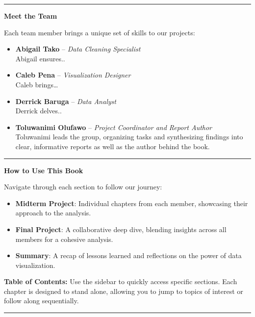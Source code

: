 \documentclass[
  letterpaper,
  DIV=11,
  numbers=noendperiod]{scrreprt}
\providecommand{\tightlist}{%
  \setlength{\itemsep}{0pt}\setlength{\parskip}{0pt}}\usepackage{longtable,booktabs,array}
\begin{document}
\begin{center}\rule{0.5\linewidth}{0.5pt}\end{center}

\textbf{Meet the Team}

Each team member brings a unique set of skills to our projects:

\begin{itemize}
\item
  \textbf{Abigail Tako} -- \emph{Data Cleaning Specialist}\\
  Abigail ensures..
\item
  \textbf{Caleb Pena} -- \emph{Visualization Designer}\\
  Caleb brings\ldots{}
\item
  \textbf{Derrick Baruga} -- \emph{Data Analyst}\\
  Derrick delves..
\item
  \textbf{Toluwanimi Olufawo} -- \emph{Project Coordinator and Report
  Author}\\
  Toluwanimi leads the group, organizing tasks and synthesizing findings
  into clear, informative reports as well as the author behind the book.
\end{itemize}

\begin{center}\rule{0.5\linewidth}{0.5pt}\end{center}

\textbf{How to Use This Book}

Navigate through each section to follow our journey:

\begin{itemize}
\tightlist
\item
  \textbf{Midterm Project}: Individual chapters from each member,
  showcasing their approach to the analysis.
\item
  \textbf{Final Project}: A collaborative deep dive, blending insights
  across all members for a cohesive analysis.
\item
  \textbf{Summary}: A recap of lessons learned and reflections on the
  power of data visualization.
\end{itemize}

\textbf{Table of Contents:} Use the sidebar to quickly access specific
sections. Each chapter is designed to stand alone, allowing you to jump
to topics of interest or follow along sequentially.

\begin{center}\rule{0.5\linewidth}{0.5pt}\end{center}
\end{document}
